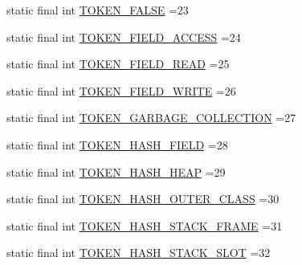 \begin{DoxyCompactItemize}
\item 
static final int \hyperlink{classgov_1_1nasa_1_1jpf_1_1inspector_1_1server_1_1expression_1_1parser_1_1_expression_grammar_lexer_a59713e8092ea5b0bcc4ff9a4067a9af6}{T\+O\+K\+E\+N\+\_\+\+F\+A\+L\+SE} =23
\item 
static final int \hyperlink{classgov_1_1nasa_1_1jpf_1_1inspector_1_1server_1_1expression_1_1parser_1_1_expression_grammar_lexer_a928a84efc48ef558f04240e16a9a181d}{T\+O\+K\+E\+N\+\_\+\+F\+I\+E\+L\+D\+\_\+\+A\+C\+C\+E\+SS} =24
\item 
static final int \hyperlink{classgov_1_1nasa_1_1jpf_1_1inspector_1_1server_1_1expression_1_1parser_1_1_expression_grammar_lexer_a62fdb59f58623a35821463001bef1602}{T\+O\+K\+E\+N\+\_\+\+F\+I\+E\+L\+D\+\_\+\+R\+E\+AD} =25
\item 
static final int \hyperlink{classgov_1_1nasa_1_1jpf_1_1inspector_1_1server_1_1expression_1_1parser_1_1_expression_grammar_lexer_a9992fb8e1c5c682cfa96419a4cb14604}{T\+O\+K\+E\+N\+\_\+\+F\+I\+E\+L\+D\+\_\+\+W\+R\+I\+TE} =26
\item 
static final int \hyperlink{classgov_1_1nasa_1_1jpf_1_1inspector_1_1server_1_1expression_1_1parser_1_1_expression_grammar_lexer_aeb3603054c7ab5970eb4de718ed056af}{T\+O\+K\+E\+N\+\_\+\+G\+A\+R\+B\+A\+G\+E\+\_\+\+C\+O\+L\+L\+E\+C\+T\+I\+ON} =27
\item 
static final int \hyperlink{classgov_1_1nasa_1_1jpf_1_1inspector_1_1server_1_1expression_1_1parser_1_1_expression_grammar_lexer_aa9a02d6b25aefea7cc35532995b6a22a}{T\+O\+K\+E\+N\+\_\+\+H\+A\+S\+H\+\_\+\+F\+I\+E\+LD} =28
\item 
static final int \hyperlink{classgov_1_1nasa_1_1jpf_1_1inspector_1_1server_1_1expression_1_1parser_1_1_expression_grammar_lexer_ab68bf55cb40e4bbe58fa6303c4d1eb84}{T\+O\+K\+E\+N\+\_\+\+H\+A\+S\+H\+\_\+\+H\+E\+AP} =29
\item 
static final int \hyperlink{classgov_1_1nasa_1_1jpf_1_1inspector_1_1server_1_1expression_1_1parser_1_1_expression_grammar_lexer_a5e8cdeb4c655cec6971e1f926d03570e}{T\+O\+K\+E\+N\+\_\+\+H\+A\+S\+H\+\_\+\+O\+U\+T\+E\+R\+\_\+\+C\+L\+A\+SS} =30
\item 
static final int \hyperlink{classgov_1_1nasa_1_1jpf_1_1inspector_1_1server_1_1expression_1_1parser_1_1_expression_grammar_lexer_ad9df03351384513b06634513db9b4122}{T\+O\+K\+E\+N\+\_\+\+H\+A\+S\+H\+\_\+\+S\+T\+A\+C\+K\+\_\+\+F\+R\+A\+ME} =31
\item 
static final int \hyperlink{classgov_1_1nasa_1_1jpf_1_1inspector_1_1server_1_1expression_1_1parser_1_1_expression_grammar_lexer_a044601203de990d4218f23eb636f57bd}{T\+O\+K\+E\+N\+\_\+\+H\+A\+S\+H\+\_\+\+S\+T\+A\+C\+K\+\_\+\+S\+L\+OT} =32

\end{DoxyCompactItemize}
